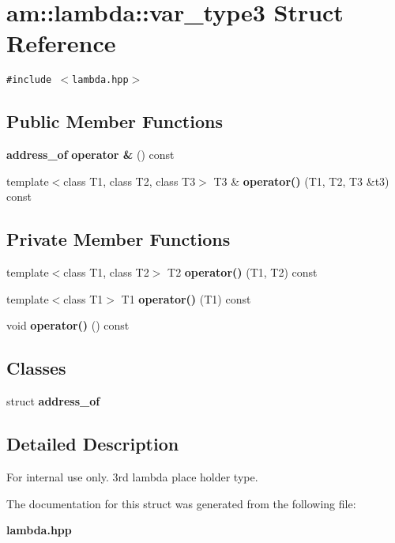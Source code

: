 \section{am::lambda::var\_\-type3 Struct Reference}
\label{structam_1_1lambda_1_1var__type3}
{\tt \#include $<$lambda.hpp$>$}

\subsection*{Public Member Functions}
\begin{CompactItemize}
\item 
{\bf address\_\-of} \textbf{operator \&} () const\label{structam_1_1lambda_1_1var__type3_d70273bbdc95b750251428c0eb831fdb}

\item 
template$<$class T1, class T2, class T3$>$ T3 \& \textbf{operator()} (T1, T2, T3 \&t3) const \label{structam_1_1lambda_1_1var__type3_a8a9aedd1d2d3714d320cb50cfb27513}

\end{CompactItemize}
\subsection*{Private Member Functions}
\begin{CompactItemize}
\item 
template$<$class T1, class T2$>$ T2 \textbf{operator()} (T1, T2) const\label{structam_1_1lambda_1_1var__type3_56ec18403573441e1d51230f0ac3e329}

\item 
template$<$class T1$>$ T1 \textbf{operator()} (T1) const\label{structam_1_1lambda_1_1var__type3_3f0fe23b87a27e08975e8008d4770238}

\item 
void \textbf{operator()} () const\label{structam_1_1lambda_1_1var__type3_2ab55cffd256fd61668651febe6f9f37}

\end{CompactItemize}
\subsection*{Classes}
\begin{CompactItemize}
\item 
struct {\bf address\_\-of}
\end{CompactItemize}


\subsection{Detailed Description}
\begin{Desc}
\item[For internal use only.]
3rd lambda place holder type. \end{Desc}




The documentation for this struct was generated from the following file:\begin{CompactItemize}
\item 
{\bf lambda.hpp}\end{CompactItemize}
